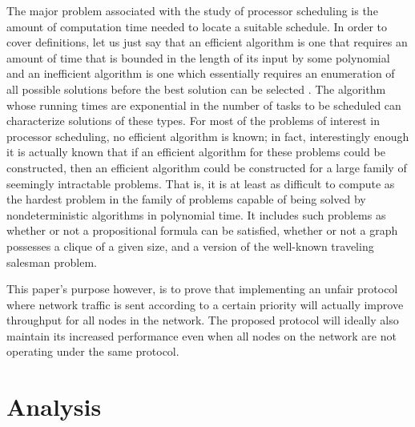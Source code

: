 \documentclass{sigcomm-alternate}
\begin{document}
The major problem associated with the study of processor scheduling is the amount of computation time needed to locate a suitable schedule. In order to cover definitions, let us just say that an efficient algorithm is one that requires an amount of time that is bounded in the length of its input by some polynomial and an inefficient algorithm is one which essentially requires an enumeration of all possible solutions before the best solution can be selected \cite{Gonzalez}. The algorithm whose running times are exponential in the number of tasks to be scheduled can characterize solutions of these types. For most of the problems of interest in processor scheduling, no efficient algorithm is known; in fact, interestingly enough it is actually known that if an efficient algorithm for these problems could be constructed, then an efficient algorithm could be constructed for a large family of seemingly intractable problems. That is, it is at least as difficult to compute as the hardest problem in the family of problems capable of being solved by nondeterministic algorithms in polynomial time. It includes such problems as whether or not a propositional formula can be satisfied, whether or not a graph possesses a clique of a given size, and a version of the well-known traveling salesman problem. 


This paper's purpose however, is to prove that implementing an unfair protocol where network traffic is sent according to a certain priority will actually improve throughput for all nodes in the network. The proposed protocol will ideally also maintain its increased performance even when all nodes on the network are not operating under the same protocol. 




\section{Analysis}
\label{section:analysis}

\end{document}
